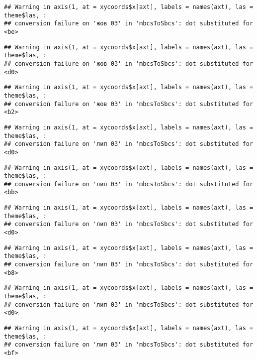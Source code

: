 \documentclass[]{article}
\begin{document}
\begin{verbatim}
## Warning in axis(1, at = xycoords$x[axt], labels = names(axt), las = theme$las, :
## conversion failure on 'жов 03' in 'mbcsToSbcs': dot substituted for <be>
\end{verbatim}

\begin{verbatim}
## Warning in axis(1, at = xycoords$x[axt], labels = names(axt), las = theme$las, :
## conversion failure on 'жов 03' in 'mbcsToSbcs': dot substituted for <d0>
\end{verbatim}

\begin{verbatim}
## Warning in axis(1, at = xycoords$x[axt], labels = names(axt), las = theme$las, :
## conversion failure on 'жов 03' in 'mbcsToSbcs': dot substituted for <b2>
\end{verbatim}

\begin{verbatim}
## Warning in axis(1, at = xycoords$x[axt], labels = names(axt), las = theme$las, :
## conversion failure on 'лип 03' in 'mbcsToSbcs': dot substituted for <d0>
\end{verbatim}

\begin{verbatim}
## Warning in axis(1, at = xycoords$x[axt], labels = names(axt), las = theme$las, :
## conversion failure on 'лип 03' in 'mbcsToSbcs': dot substituted for <bb>
\end{verbatim}

\begin{verbatim}
## Warning in axis(1, at = xycoords$x[axt], labels = names(axt), las = theme$las, :
## conversion failure on 'лип 03' in 'mbcsToSbcs': dot substituted for <d0>
\end{verbatim}

\begin{verbatim}
## Warning in axis(1, at = xycoords$x[axt], labels = names(axt), las = theme$las, :
## conversion failure on 'лип 03' in 'mbcsToSbcs': dot substituted for <b8>
\end{verbatim}

\begin{verbatim}
## Warning in axis(1, at = xycoords$x[axt], labels = names(axt), las = theme$las, :
## conversion failure on 'лип 03' in 'mbcsToSbcs': dot substituted for <d0>
\end{verbatim}

\begin{verbatim}
## Warning in axis(1, at = xycoords$x[axt], labels = names(axt), las = theme$las, :
## conversion failure on 'лип 03' in 'mbcsToSbcs': dot substituted for <bf>
\end{verbatim}
\end{document}
